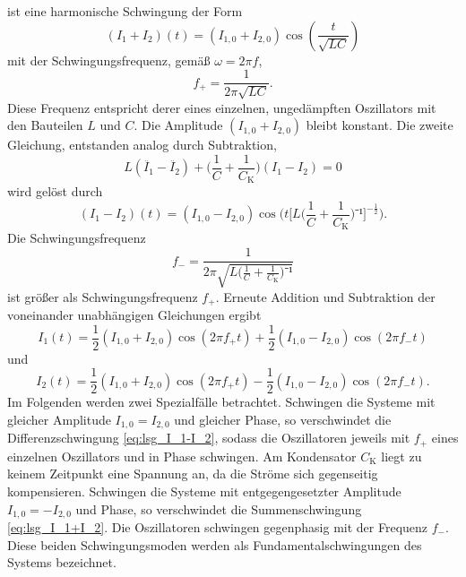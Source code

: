 ist eine harmonische Schwingung der Form
\begin{equation}
	({I_1}+{I_2})(t)=({I_{1,0}}+{I_{2,0}})\cos(\frac{t}{\sqrt{LC}})
\label{eq:lsg_I_1+I_2}
\end{equation}
mit der Schwingungsfrequenz, gemäß $\omega=2\pi f$,
\begin{equation}
f_+=\frac{1}{2\pi\sqrt{LC}}.
\label{eq:f_+}
\end{equation}
Diese Frequenz entspricht derer eines einzelnen, ungedämpften Oszillators mit den Bauteilen $L$ und $C$.
 Die Amplitude $(I_{1,0}+I_{2,0})$ bleibt konstant.
Die zweite Gleichung, entstanden analog durch Subtraktion,
\begin{equation}
	L(\ddot{I_1}-\ddot{I_2})+\bigl(\frac{1}{C}+\frac{1}{C_\mathup{K}}\bigr)({I_1}-{I_2})=0
	\label{eq:I_1-I_2}
\end{equation}
wird gelöst durch
\begin{equation}
	({I_1}-{I_2})(t)=({I_{1,0}}-{I_{2,0}})\cos\biggl(t{\biggl[L\biggl({\frac{1}{C}+\frac{1}{C_\mathup{K}}}\biggr)⁻¹\biggr]^{-\frac{1}{2}}}\biggr).
\label{eq:lsg_I_1-I_2}
\end{equation}
Die Schwingungsfrequenz 
\begin{equation}
f_-=\frac{1}{2\pi\sqrt{L\bigl({\frac{1}{C}+\frac{1}{C_\mathup{K}}}\bigr)⁻¹}}
\label{eq:f_-}
\end{equation}
 ist größer als Schwingungsfrequenz $f_+$.
Erneute Addition und Subtraktion der voneinander unabhängigen Gleichungen ergibt
\begin{equation}
	I_1(t)=\frac{1}{2}({I_{1,0}}+{I_{2,0}})\cos(2\pi f_+t)+\frac{1}{2}({I_{1,0}}-{I_{2,0}})\cos(2\pi f_-t)
	\label{eq:I_1_ur}
\end{equation}
und
\begin{equation}
	I_2(t)=\frac{1}{2}({I_{1,0}}+{I_{2,0}})\cos(2\pi f_+ t)-\frac{1}{2}({I_{1,0}}-{I_{2,0}})\cos(2\pi f_- t).
	\label{eq:I_2_ur}
\end{equation}
Im Folgenden werden zwei Spezialfälle betrachtet. 
Schwingen die Systeme mit gleicher Amplitude $I_{1,0}=I_{2,0}$ und gleicher Phase, so verschwindet die Differenzschwingung \eqref{eq:lsg_I_1-I_2}, sodass die Oszillatoren jeweils mit $f_+$ eines einzelnen Oszillators und in Phase schwingen.
 Am Kondensator $C_\mathup{K}$ liegt zu keinem Zeitpunkt eine Spannung an, da die Ströme sich gegenseitig kompensieren.
Schwingen die Systeme mit entgegengesetzter Amplitude  $I_{1,0}=-I_{2,0}$ und Phase, so verschwindet die Summenschwingung \eqref{eq:lsg_I_1+I_2}. Die Oszillatoren schwingen gegenphasig mit der Frequenz $f_-$.
Diese beiden Schwingungsmoden werden als Fundamentalschwingungen des Systems bezeichnet.

